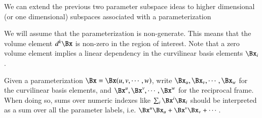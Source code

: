 %
%

We can extend the previous two parameter subspace ideas to higher dimensional (or one dimensional) subspaces associated with a parameterization


We will assume that the parameterization is non-generate.
This means that the
volume element \( d^k \Bx \) is non-zero in the region of interest.
Note that a zero volume element implies a linear dependency in the curvilinear basis elements \( \Bx_i \).

Given a parameterization \( \Bx = \Bx(u,v,\cdots, w) \), write
\( \Bx_u, \Bx_v, \cdots, \Bx_w \) for the curvilinear basis elements, and
\( \Bx^u, \Bx^v, \cdots, \Bx^w \) for the reciprocal frame.
When doing so, sums over numeric indexes like \( \sum_i \Bx^i \Bx_i \) should be interpreted as a sum over all the parameter labels, i.e. \( \Bx^u \Bx_u + \Bx^v \Bx_v + \cdots \).


